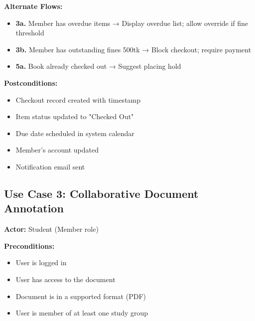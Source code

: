 \documentclass[12pt,a4paper]{report}
\begin{document}
\textbf{Alternate Flows:}
\begin{itemize}
    \item \textbf{3a.} Member has overdue items → Display overdue list; allow override if fine \< threshold
    \item \textbf{3b.} Member has outstanding fines \> 500tk → Block checkout; require payment
    \item \textbf{5a.} Book already checked out → Suggest placing hold
\end{itemize}

\textbf{Postconditions:}
\begin{itemize}
    \item Checkout record created with timestamp
    \item Item status updated to "Checked Out"
    \item Due date scheduled in system calendar
    \item Member's account updated
    \item Notification email sent
\end{itemize}

\subsection{Use Case 3: Collaborative Document Annotation}

\textbf{Actor:} Student (Member role)

\textbf{Preconditions:}
\begin{itemize}
    \item User is logged in
    \item User has access to the document
    \item Document is in a supported format (PDF)
    \item User is member of at least one study group
\end{itemize}
\end{document}
